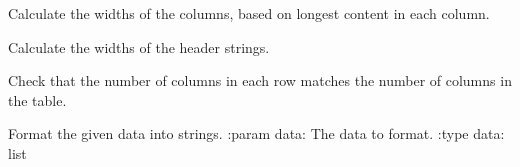 \documentclass[letterpaper,10pt,english]{sphinxmanual}
\begin{document}
\begin{fulllineitems}
\begin{fulllineitems}
\begin{quote}
\begin{description}
\end{description}\end{quote}

\end{fulllineitems}


\begin{fulllineitems}
\label{\detokenize{nodes:nodes.nodePrinter.tablePrinter.calc_col_widths}}
\pysigstartsignatures
\pysiglinewithargsret
{}
{}
{}
\pysigstopsignatures
\sphinxAtStartPar
Calculate the widths of the columns, based on longest content in each column.

\end{fulllineitems}


\begin{fulllineitems}
\label{\detokenize{nodes:nodes.nodePrinter.tablePrinter.calc_header_width}}
\pysigstartsignatures
\pysiglinewithargsret
{}
{}
{}
\pysigstopsignatures
\sphinxAtStartPar
Calculate the widths of the header strings.

\end{fulllineitems}


\begin{fulllineitems}
\label{\detokenize{nodes:nodes.nodePrinter.tablePrinter.check_row_column_lengths}}
\pysigstartsignatures
\pysiglinewithargsret
{}
{}
{}
\pysigstopsignatures
\sphinxAtStartPar
Check that the number of columns in each row matches the number of columns in the table.

\end{fulllineitems}


\begin{fulllineitems}
\label{\detokenize{nodes:nodes.nodePrinter.tablePrinter.format}}
\pysigstartsignatures
\pysiglinewithargsret
{}
{}
{}
\pysigstopsignatures
\sphinxAtStartPar
Format the given data into strings.
:param data: The data to format.
:type data: list


\end{fulllineitems}
\end{fulllineitems}
\end{document}
